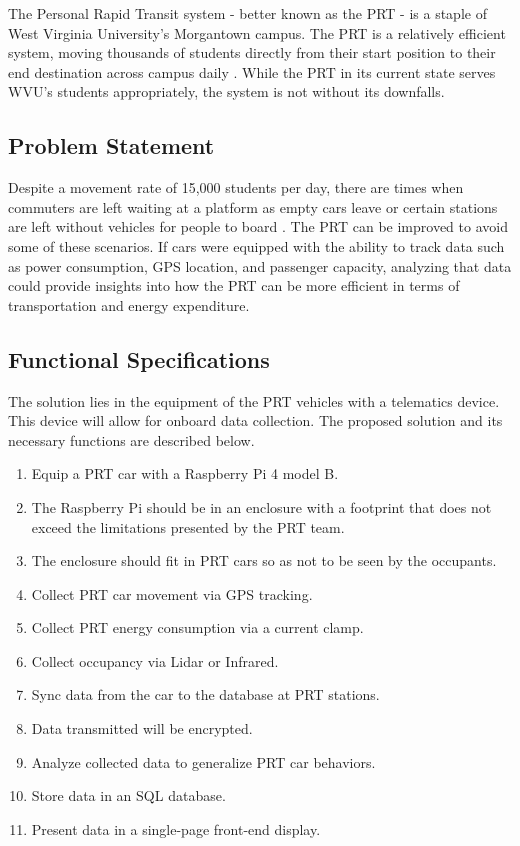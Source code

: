 The Personal Rapid Transit system - better known as the PRT - is a staple of West Virginia University’s Morgantown campus. The PRT is a relatively efficient system, moving thousands of students directly from their start position to their end destination across campus daily \cite{about-prt}. While the PRT in its current state serves WVU’s students appropriately, the system is not without its downfalls.

\subsection{Problem Statement}
Despite a movement rate of 15,000 students per day, there are times when commuters are left waiting at a platform as empty cars leave or certain stations are left without vehicles for people to board \cite{about-prt}. The PRT can be improved to avoid some of these scenarios. If cars were equipped with the ability to track data such as power consumption, GPS location, and passenger capacity, analyzing that data could provide insights into how the PRT can be more efficient in terms of transportation and energy expenditure.

\subsection{Functional Specifications}
The solution lies in the equipment of the PRT vehicles with a telematics device. This device will allow for onboard data collection. The proposed solution and its necessary functions are described below.
\begin{enumerate}
    \item Equip a PRT car with a Raspberry Pi 4 model B.
    \item The Raspberry Pi should be in an enclosure with a footprint that does not exceed the limitations presented by the PRT team.
    \item The enclosure should fit in PRT cars so as not to be seen by the occupants.
    \item Collect PRT car movement via GPS tracking.
    \item Collect PRT energy consumption via a current clamp.
    \item Collect occupancy via Lidar or Infrared.
    \item Sync data from the car to the database at PRT stations.
    \item Data transmitted will be encrypted.
    \item Analyze collected data to generalize PRT car behaviors.
    \item Store data in an SQL database.
    \item Present data in a single-page front-end display.
\end{enumerate}

